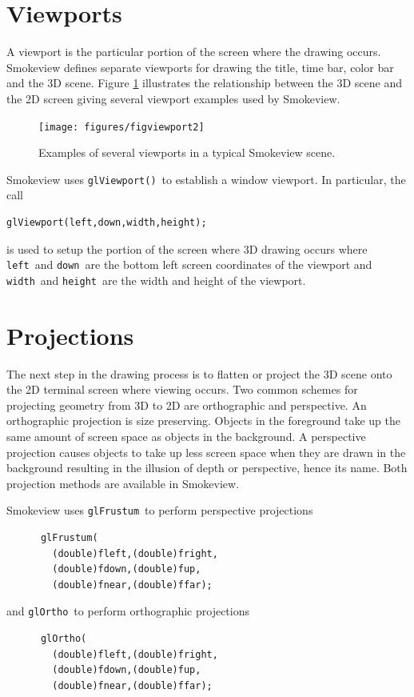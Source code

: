 \documentclass[11pt,twoside]{book}
\begin{document}
\section{Viewports}
A
viewport is the particular portion of the screen where the drawing
occurs.  Smokeview defines separate viewports for drawing the
title, time bar, color bar and the 3D scene.  Figure
\ref{figviewports} illustrates the relationship between the 3D
scene and the 2D screen giving several viewport examples used by
Smokeview.
\begin{figure}[t]
\begin{center}
\texttt{[image: figures/figviewport2]}
\end{center}
\caption{Examples of several viewports in a typical Smokeview scene.}
 \label{figviewports}
\end{figure}

Smokeview uses {\tt glViewport()}\ to establish a window viewport.  In particular, the call
\begin{verbatim}
glViewport(left,down,width,height);
\end{verbatim}
is used to setup the portion of the screen where 3D drawing occurs where {\tt left}\
and {\tt down}\ are the bottom left screen coordinates of the viewport and {\tt width}\
and {\tt height}\ are the width and height of the viewport.

\section{Projections}
The next step in the drawing process is to flatten or project the
3D scene onto the 2D terminal screen where viewing occurs. Two common schemes for projecting geometry from 3D to
2D  are orthographic and perspective. An orthographic projection
is size preserving. Objects in the foreground take up the same
amount of screen space as objects in the background. A perspective
projection causes objects to take up less screen space when they
are drawn in the background resulting in the illusion of depth or
perspective, hence its name. Both projection methods are available
in Smokeview.

Smokeview uses {\tt glFrustum}\ to perform perspective projections
\begin{verbatim}
      glFrustum(
        (double)fleft,(double)fright,
        (double)fdown,(double)fup,
        (double)fnear,(double)ffar);
\end{verbatim}
and {\tt glOrtho}\ to perform orthographic projections
\begin{verbatim}
      glOrtho(
        (double)fleft,(double)fright,
        (double)fdown,(double)fup,
        (double)fnear,(double)ffar);
\end{verbatim}
\end{document}
